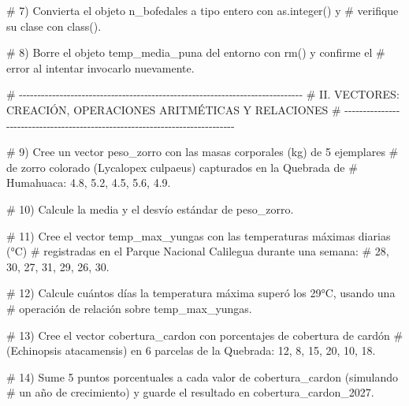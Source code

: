 \documentclass[
  spanish,
  letterpaper,
  DIV=11,
  numbers=noendperiod]{scrreprt}
\newenvironment{Shaded}{\begin{snugshade}}{\end{snugshade}}
\newcommand{\CommentTok}[1]{\textcolor[rgb]{0.37,0.37,0.37}{#1}}
\begin{document}
\begin{Shaded}
\begin{Highlighting}[]
\CommentTok{\# 7) Convierta el objeto \textquotesingle{}n\_bofedales\textquotesingle{} a tipo entero con as.integer() y}
\CommentTok{\#    verifique su clase con class().}


\CommentTok{\# 8) Borre el objeto \textquotesingle{}temp\_media\_puna\textquotesingle{} del entorno con rm() y confirme el}
\CommentTok{\#    error al intentar invocarlo nuevamente.}


\CommentTok{\# {-}{-}{-}{-}{-}{-}{-}{-}{-}{-}{-}{-}{-}{-}{-}{-}{-}{-}{-}{-}{-}{-}{-}{-}{-}{-}{-}{-}{-}{-}{-}{-}{-}{-}{-}{-}{-}{-}{-}{-}{-}{-}{-}{-}{-}{-}{-}{-}{-}{-}{-}{-}{-}{-}{-}{-}{-}{-}{-}{-}{-}{-}{-}{-}{-}{-}{-}{-}{-}{-}{-}{-}{-}{-}{-}{-}{-}}
\CommentTok{\# II. VECTORES: CREACIÓN, OPERACIONES ARITMÉTICAS Y RELACIONES}
\CommentTok{\# {-}{-}{-}{-}{-}{-}{-}{-}{-}{-}{-}{-}{-}{-}{-}{-}{-}{-}{-}{-}{-}{-}{-}{-}{-}{-}{-}{-}{-}{-}{-}{-}{-}{-}{-}{-}{-}{-}{-}{-}{-}{-}{-}{-}{-}{-}{-}{-}{-}{-}{-}{-}{-}{-}{-}{-}{-}{-}{-}{-}{-}{-}{-}{-}{-}{-}{-}{-}{-}{-}{-}{-}{-}{-}{-}{-}{-}}

\CommentTok{\# 9) Cree un vector \textquotesingle{}peso\_zorro\textquotesingle{} con las masas corporales (kg) de 5 ejemplares}
\CommentTok{\#    de zorro colorado (Lycalopex culpaeus) capturados en la Quebrada de}
\CommentTok{\#    Humahuaca: 4.8, 5.2, 4.5, 5.6, 4.9.}


\CommentTok{\# 10) Calcule la media y el desvío estándar de \textquotesingle{}peso\_zorro\textquotesingle{}.}


\CommentTok{\# 11) Cree el vector \textquotesingle{}temp\_max\_yungas\textquotesingle{} con las temperaturas máximas diarias (°C)}
\CommentTok{\#     registradas en el Parque Nacional Calilegua durante una semana:}
\CommentTok{\#     28, 30, 27, 31, 29, 26, 30.}


\CommentTok{\# 12) Calcule cuántos días la temperatura máxima superó los 29°C, usando una}
\CommentTok{\#     operación de relación sobre \textquotesingle{}temp\_max\_yungas\textquotesingle{}.}


\CommentTok{\# 13) Cree el vector \textquotesingle{}cobertura\_cardon\textquotesingle{} con porcentajes de cobertura de cardón}
\CommentTok{\#     (Echinopsis atacamensis) en 6 parcelas de la Quebrada: 12, 8, 15, 20, 10, 18.}


\CommentTok{\# 14) Sume 5 puntos porcentuales a cada valor de \textquotesingle{}cobertura\_cardon\textquotesingle{} (simulando}
\CommentTok{\#     un año de crecimiento) y guarde el resultado en \textquotesingle{}cobertura\_cardon\_2027\textquotesingle{}.}



\end{Highlighting}
\end{Shaded}
\end{document}
